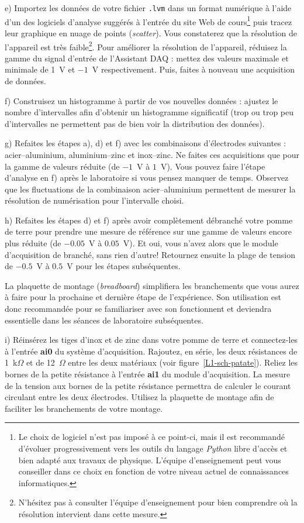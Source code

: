 \documentclass[canadien,12pt,oneside,letterpaper]{article}
\begin{document}
e) Importez les données de votre fichier \texttt{.lvm} dans un format numérique à l'aide d'un des logiciels d'analyse suggérés à l'entrée du site Web de cours\footnote{Le choix de logiciel n'est pas imposé à ce point-ci, mais il est recommandé d'évoluer progressivement vers les outils du langage \textit{Python} libre d'accès et bien adapté aux travaux de physique. L'équipe d'enseignement peut vous conseiller dans ce choix en fonction de votre niveau actuel de connaissances informatiques.} puis tracez leur graphique en nuage de points (\textit{scatter}). Vous constaterez que la résolution de l'appareil est très faible\footnote{N'hésitez pas à consulter l'équipe d'enseignement pour bien comprendre où la résolution intervient dans cette mesure.}. Pour améliorer la résolution de l'appareil, réduisez la gamme du signal d'entrée de l'Assistant DAQ : mettez des valeurs maximale et minimale de 1~V et $-1$~V respectivement. Puis, faites à nouveau une acquisition de données.

f) Construisez un histogramme à partir de vos nouvelles données : ajustez le nombre d'intervalles afin d'obtenir un histogramme significatif (trop ou trop peu d'intervalles ne permettent pas de bien voir la distribution des données).

g) Refaites les étapes a), d) et f) avec les combinaisons d'électrodes suivantes : acier--aluminium, aluminium--zinc et inox--zinc. Ne faites ces acquisitions que pour la gamme de valeurs réduite (de $-1$~V à $1$~V). Vous pouvez faire l'étape d'analyse en f) après le laboratoire si vous pensez manquer de temps. Observez que les fluctuations de la combinaison acier--aluminium permettent de mesurer la résolution de numérisation pour l'intervalle choisi.

h) Refaites les étapes d) et f) après avoir complètement débranché votre pomme de terre pour prendre une mesure de référence sur une gamme de valeurs encore plus réduite (de $-0.05$~V à $0.05$~V). Et oui, vous n’avez alors que le module d’acquisition de branché, sans rien d’autre! Retournez ensuite la plage de tension de $-0.5$~V à $0.5$~V pour les étapes subséquentes.

La plaquette de montage (\textit{breadboard}) simplifiera les branchements que vous aurez à faire pour la prochaine et dernière étape de l'expérience. Son utilisation est donc recommandée pour se familiariser avec son fonctionnent et deviendra essentielle dans les séances de laboratoire subséquentes.

i) Réinsérez les tiges d'inox et de zinc dans votre pomme de terre et connectez-les à l'entrée \textbf{ai0} du système d'acquisition. Rajoutez, en série, les deux résistances de 1~k$\Omega$ et de 12~$\Omega$ entre les deux matériaux (voir figure~\ref{L1-sch-patate}). Reliez les bornes de la petite résistance à l'entrée \textbf{ai1} du module d'acquisition. La mesure de la tension aux bornes de la petite résistance permettra de calculer le courant circulant entre les deux électrodes. Utilisez la plaquette de montage afin de faciliter les branchements de votre montage.
\end{document}
